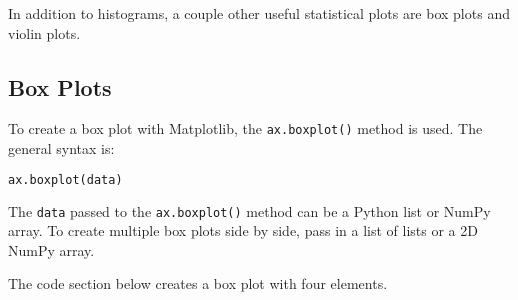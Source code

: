 \documentclass{book}
\newcommand{\passthrough}[1]{#1}
\begin{document}
    
        In addition to histograms, a couple other useful statistical plots are
box plots and violin plots.
    




    
        \hypertarget{box-plots}{%
\subsection{Box Plots}\label{box-plots}}
    




    
        To create a box plot with Matplotlib, the
\passthrough{\lstinline!ax.boxplot()!} method is used. The general
syntax is:

\begin{lstlisting}[language=Python]
ax.boxplot(data)
\end{lstlisting}

The \passthrough{\lstinline!data!} passed to the
\passthrough{\lstinline!ax.boxplot()!} method can be a Python list or
NumPy array. To create multiple box plots side by side, pass in a list
of lists or a 2D NumPy array.

The code section below creates a box plot with four elements.
    
\end{document}

